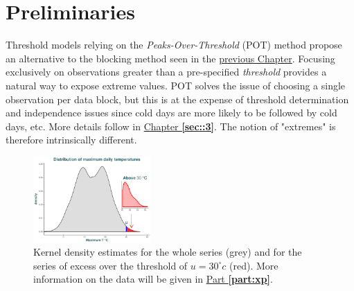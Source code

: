 
\section{Preliminaries}\label{sec::2.1}

Threshold models relying on the \emph{Peaks-Over-Threshold} (POT) method propose an alternative to the blocking method seen in the \hyperref[sec::1]{previous Chapter}. Focusing exclusively on observations greater than a pre-specified \emph{threshold} provides a natural way to expose extreme values. POT solves the issue of choosing a single observation per data block, but this is at the expense of threshold determination and independence issues since cold days are more likely to be followed by cold days, etc. More details follow in \hyperref[sec::3]{Chapter \textbf{\ref{sec::3}}}. The notion of "extremes" is therefore intrinsically different.


\begin{figure}
	\centering
	\includegraphics[width=0.4\textwidth]{pot_plot.pdf} %
	\caption{Kernel density estimates for the whole series (grey) and for the series of excess over the threshold of $u=30^{\circ} c$ (red). More information on the data will be given in \hyperref[part:xp]{Part \textbf{\ref{part:xp}}}.}
	\label{fig:pot_plot}
\end{figure}


